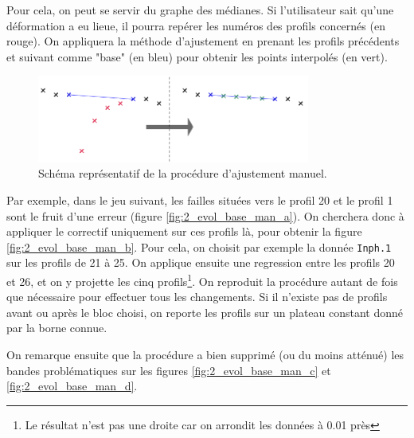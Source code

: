 \documentclass[12pt]{article}
\begin{document}
    Pour cela, on peut se servir du graphe des médianes. Si l'utilisateur sait qu'une déformation a eu lieue, il pourra repérer les numéros des profils concernés (en rouge). On appliquera la méthode d'ajustement en prenant les profils précédents et suivant comme "base" (en bleu) pour obtenir les points interpolés (en vert).

    \begin{figure}[ht!]
        \centering
        \includegraphics[width=0.8\textwidth]{Images/Base_Schema_of_all_time.png}  
        \caption{Schéma représentatif de la procédure d'ajustement manuel.}
    \end{figure}

    Par exemple, dans le jeu suivant, les failles situées vers le profil 20 et le profil 1 sont le fruit d'une erreur (figure \ref{fig:2_evol_base_man_a}). On cherchera donc à appliquer le correctif uniquement sur ces profils là, pour obtenir la figure \ref{fig:2_evol_base_man_b}. Pour cela, on choisit par exemple la donnée \texttt{Inph.1} sur les profils de 21 à 25. On applique ensuite une regression entre les profils 20 et 26, et on y projette les cinq profils\footnote{Le résultat n'est pas une droite car on arrondit les données à 0.01 près}. On reproduit la procédure autant de fois que nécessaire pour effectuer tous les changements. Si il n'existe pas de profils avant ou après le bloc choisi, on reporte les profils sur un plateau constant donné par la borne connue.
    
    On remarque ensuite que la procédure a bien supprimé (ou du moins atténué) les bandes problématiques sur les figures \ref{fig:2_evol_base_man_c} et \ref{fig:2_evol_base_man_d}.\\
\end{document}
